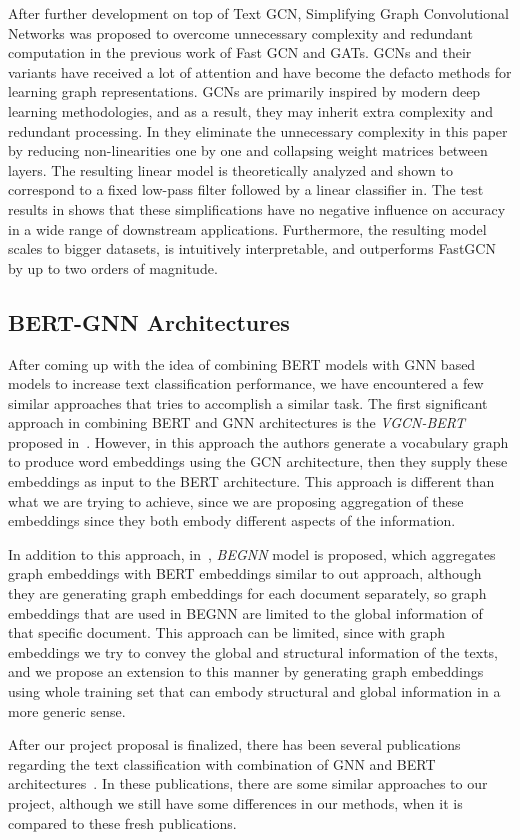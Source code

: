 After further development on top of Text GCN, Simplifying Graph Convolutional Networks \cite{simplfyingGCN2019} was proposed to overcome unnecessary complexity and redundant computation in the previous work of Fast GCN and GATs. GCNs and their variants have received a lot of attention and have become the defacto methods for learning graph representations. GCNs are primarily inspired by modern deep learning methodologies, and as a result, they may inherit extra complexity and redundant processing. In \autocite{simplfyingGCN2019} they eliminate the unnecessary complexity in this paper by reducing non-linearities one by one and collapsing weight matrices between layers. The resulting linear model is theoretically analyzed and shown to correspond to a fixed low-pass filter followed by a linear classifier in. The test results in \autocite{simplfyingGCN2019} shows that these simplifications have no negative influence on accuracy in a wide range of downstream applications. Furthermore, the resulting model scales to bigger datasets, is intuitively interpretable, and outperforms FastGCN by up to two orders of magnitude.

\subsection{BERT-GNN Architectures}\label{sec:related:bertgnn}
After coming up with the idea of combining BERT models with GNN based models to increase text classification performance, we have encountered a few similar approaches that tries to accomplish a similar task. The first significant approach in combining BERT and GNN architectures is the \emph{VGCN-BERT} proposed in~\autocite{zhibin2020vgcn}. However, in this approach the authors generate a vocabulary graph to produce word embeddings using the GCN architecture, then they supply these embeddings as input to the BERT architecture. This approach is different than what we are trying to achieve, since we are proposing aggregation of these embeddings since they both embody different aspects of the information.

In addition to this approach, in~\autocite{yang2021bertenhanced}, \emph{BEGNN} model is proposed, which aggregates graph embeddings with BERT embeddings similar to out approach, although they are generating graph embeddings for each document separately, so graph embeddings that are used in BEGNN are limited to the global information of that specific document. This approach can be limited, since with graph embeddings we try to convey the global and structural information of the texts, and we propose an extension to this manner by generating graph embeddings using whole training set that can embody structural and global information in a more generic sense.

After our project proposal is finalized, there has been several publications regarding the text classification with combination of GNN and BERT architectures~\autocite{lin2022bertgcn,she2022bertgcnattention,zeng2022boosting}. In these publications, there are some similar approaches to our project, although we still have some differences in our methods, when it is compared to these fresh publications.
